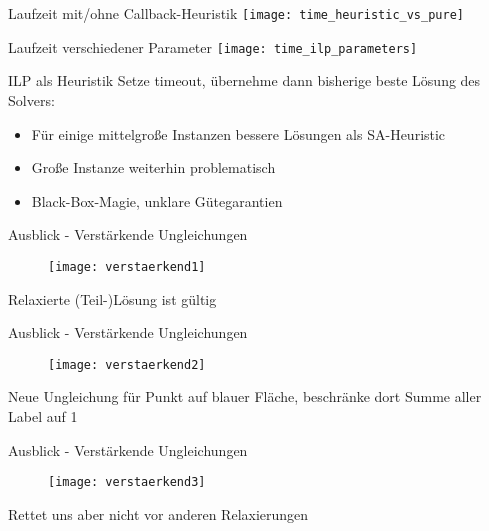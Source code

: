 \documentclass[ngerman,aspectratio=169,10pt]{beamer}
\begin{document}
\begin{frame}{Laufzeit mit/ohne Callback-Heuristik}
    \centering
    \texttt{[image: time\_heuristic\_vs\_pure]}
\end{frame}

\begin{frame}{Laufzeit verschiedener Parameter}
    \centering
    \texttt{[image: time\_ilp\_parameters]}
\end{frame}

\begin{frame}{ILP als Heuristik}
    Setze timeout, übernehme dann bisherige beste Lösung des Solvers:
    \begin{itemize}
        \item Für einige mittelgroße Instanzen bessere Lösungen als SA-Heuristic
        \item Große Instanze weiterhin problematisch
        \item Black-Box-Magie, unklare Gütegarantien
    \end{itemize}
\end{frame}

\begin{frame}{Ausblick - Verstärkende Ungleichungen}
    \begin{figure}
        \texttt{[image: verstaerkend1]}
    \end{figure}
    Relaxierte (Teil-)Lösung ist gültig
\end{frame}

\begin{frame}{Ausblick - Verstärkende Ungleichungen}
    \begin{figure}
        \texttt{[image: verstaerkend2]}
    \end{figure}
    Neue Ungleichung für Punkt auf blauer Fläche, beschränke dort Summe aller Label auf 1
\end{frame}

\begin{frame}{Ausblick - Verstärkende Ungleichungen}
    \begin{figure}
        \texttt{[image: verstaerkend3]}
    \end{figure}
    Rettet uns aber nicht vor anderen Relaxierungen
\end{frame}
\end{document}

